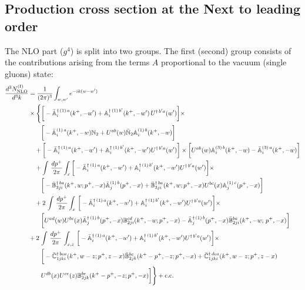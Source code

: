 \documentclass[aps,prd,amsmath,amssymb,nofootinbib]{revtex4-2}
\def\mf#1{\mathbb{#1}}
\numberwithin{equation}{section}
\begin{document}
\subsection{Production cross section at the Next to leading order}
The NLO part ($g^4$) is split into two groups. The first (second) group consists
of the contributions arising from the terms $A$ proportional to the vacuum (single gluons) state: 
\begin{align} \label{eq:CS1}
    \frac{d^{3}N_{\rm NLO}^{\rm (I)}}{d^{3}k} & =
    \frac{1}{(2\pi)^{3}}  \int_{w, w^\prime} e^{-ik(w-w^\prime)}
    \notag \\ & \times \Bigg\{\bigg[-\bar{\mf{A}}^{\dagger\,(1)\,a}_{i}(k^{+},-w^{\prime})+\mf{A}^{\dagger\, (1)\, b^{\prime}}_{i}(k^{+},-w^{\prime})\,U^{\dagger\, b^{\prime}a}(w^{\prime})\bigg]\times\notag \\ & \quad\quad\bigg[-\bar{\mf{A}}^{(1)\,a}_{i}(k^{+},-w)\mf{N}_{2}+ U^{ab}(w)\bar{\mf{N}}_{2}\mf{A}^{(1)\, b}_{i}(k^{+},-w)\bigg]\notag \\ & \quad +\bigg[-\bar{\mf{A}}^{\dagger\,(1)\,a}_{i}(k^{+},-w^{\prime})+\mf{A}^{\dagger\, (1)\, b^{\prime}}_{i}(k^{+},-w^{\prime})U^{\dagger\, b^{\prime}a}(w^{\prime})\bigg]\times\bigg[U^{ab}(w)\mf{A}^{(3)\, b}_{i}(k^{+},- w)-\Bar{\mf{A}}^{(3)\, a}_{i}(k^{+}, - w)\bigg]\notag \\ & \quad +\int\,\frac{dp^{+}}{2\pi} \int_{x} \bigg[-\bar{\mf{A}}^{\dagger\,(1)\,a}_{i}(k^{+},-w^{\prime})+\mf{A}^{\dagger\, (1)\, b^{\prime}}_{i}(k^{+},-w^{\prime})U^{\dagger\, b^{\prime}a}(w^{\prime})\bigg]\times\notag \\ & \quad \quad \bigg[-\Bar{\mf{B}}^{\dagger\, ba}_{3ji}(k^{+}, w; p^{+}, -x)\Bar{\mf{A}}^{(1)\,b}_{j}(p^{+}, - x)
         + \Bar{\mf{B}}^{\dagger\, ba}_{3ji}(k^{+},w; p^{+},-x) U^{bc}(x) \mf{A}^{(1)\, c}_{j}(p^{+},- x)\bigg]\notag \\ & \quad  +2\, \int\,\frac{dp^{+}}{2\pi} \int_{x}\,\bigg[-\bar{\mf{A}}^{\dagger\,(1)\,a}_{i}(k^{+},-w^{\prime})+\mf{A}^{\dagger\, (1)\, b^{\prime}}_{i}(k^{+},-w^{\prime})U^{\dagger\, b^{\prime}a}(w^{\prime})\bigg]\times \notag \\ & \quad \quad \bigg[U^{ad}(w)U^{bc}(x) \bar{\mf{A}}^{\dagger\, (1)\, b}_{j}(p^+,- x) {\mf{B}}^{cd}_{2ji} (k^+, -w;p^+, -x) - \Bar{\mf{A}}^{\dagger\, (1)\, b}_{j}(p^{+}, -x)\Bar{\mf{B}}^{ba}_{2ji}(k^{+},-w;\,p^{+}, -x) \bigg] \notag \\ &+  2\, \int\, \frac{dp^{+}}{2\pi}\,\int_{x,z}\, \bigg[-\bar{\mf{A}}^{\dagger\,(1)\,a}_{i}(k^{+},-w^{\prime})+\mf{A}^{\dagger\, (1)\, b^{\prime}}_{i}(k^{+},-w^{\prime})U^{\dagger\, b^{\prime}a}(w^{\prime})\bigg]\times\notag \\ & \quad \quad \bigg[-\Bar{\mf{C}}^{\dagger\, bca}_{1jki}(k^{+},w-z;p^{+},z-x)\Bar{\mf{B}}^{bc}_{2jk}(k^{+}-p^{+},- z;p^{+},-x)
           +\bar{\mf{C}}^{\dagger\, dca}_{1jki}(k^+,w-z; p^+, z-x)  \notag \\ &\quad \quad
                 U^{db}(x)
                 U^{ce}(z) 
                {\mf{B}}^{be}_{2jk} (k^{+}-p^+, -z; p^+, -x) \bigg]  \Bigg\}+ {\rm c.c.}
\end{align}
\end{document}
